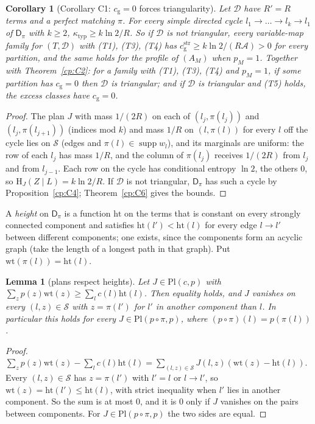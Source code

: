 \documentclass[11pt]{article}
\newtheorem{lemma}[theorem]{Lemma}
\newtheorem{corollary}[theorem]{Corollary}
\theoremstyle{definition}
\theoremstyle{remark}
\newcommand{\Ent}{\mathrm{H}}                 %
\DeclareMathOperator{\supp}{supp}
\newcommand{\cg}{c_{\mathrm g}}               %
\newcommand{\Tcond}[1]{\textup{(T#1)}}        %
\newcommand{\Acs}{\mathcal A}                %
\newcommand{\ktyp}{\kappa_{\mathrm{typ}}}    %
\newcommand{\Dpi}{\mathsf D_\pi}             %
\newcommand{\Sr}{\mathcal S}                 %
\newcommand{\Pl}{\mathrm{Pl}}                %
\newcommand{\wt}{\mathrm{wt}}                %
\newcommand{\hgt}{\mathrm{ht}}               %
\begin{document}
\begin{corollary}[Corollary C1: $\cg=0$ forces triangularity]\label{cp:C7}
Let $\mathcal D$ have $R'=R$ terms and a perfect matching $\pi$. For every simple directed cycle $l_1\to\dots\to l_k\to l_1$ of $\Dpi$ with $k\ge2$, $\ktyp\ge k\ln2/R$. So if $\mathcal D$ is not triangular, every variable-map family for $(T,\mathcal D)$ with \Tcond1, \Tcond3, \Tcond4{} has $\cg^{\mathrm{str}}\ge k\ln2/(R\Acs)>0$ for every partition, and the same holds for the profile of $(A_M)$ when $p_M=1$. Together with Theorem~\ref{cp:C2}: for a family with \Tcond1, \Tcond3, \Tcond4{} and $p_M=1$, if some partition has $\cg=0$ then $\mathcal D$ is triangular; and if $\mathcal D$ is triangular and \Tcond5{} holds, the excess classes have $\cg=0$.
\end{corollary}

\begin{proof}
The plan $J$ with mass $1/(2R)$ on each of $(l_j,\pi(l_j))$ and $(l_j,\pi(l_{j+1}))$ (indices mod $k$) and mass $1/R$ on $(l,\pi(l))$ for every $l$ off the cycle lies on $\Sr$ (edges and $\pi(l)\in\supp w_l$), and its marginals are uniform: the row of each $l_j$ has mass $1/R$, and the column of $\pi(l_j)$ receives $1/(2R)$ from $l_j$ and from $l_{j-1}$. Each row on the cycle has conditional entropy $\ln2$, the others $0$, so $\Ent_J(Z\mid L)=k\ln2/R$. If $\mathcal D$ is not triangular, $\Dpi$ has such a cycle by Proposition~\ref{cp:C4}; Theorem~\ref{cp:C6} gives the bounds.
\end{proof}

A \emph{height} on $\Dpi$ is a function $\hgt$ on the terms that is constant on every strongly connected component and satisfies $\hgt(l')<\hgt(l)$ for every edge $l\to l'$ between different components; one exists, since the components form an acyclic graph (take the length of a longest path in that graph). Put $\wt(\pi(l))=\hgt(l)$.

\begin{lemma}[plans respect heights]\label{cp:C8:H}
Let $J\in\Pl(c,p)$ with $\sum_zp(z)\wt(z)\ge\sum_lc(l)\hgt(l)$. Then equality holds, and $J$ vanishes on every $(l,z)\in\Sr$ with $z=\pi(l')$ for $l'$ in another component than $l$. In particular this holds for every $J\in\Pl(p\circ\pi,p)$, where $(p\circ\pi)(l)=p(\pi(l))$.
\end{lemma}

\begin{proof}
$\sum_zp(z)\wt(z)-\sum_lc(l)\hgt(l)=\sum_{(l,z)\in\Sr}J(l,z)(\wt(z)-\hgt(l))$. Every $(l,z)\in\Sr$ has $z=\pi(l')$ with $l'=l$ or $l\to l'$, so $\wt(z)=\hgt(l')\le\hgt(l)$, with strict inequality when $l'$ lies in another component. So the sum is at most $0$, and it is $0$ only if $J$ vanishes on the pairs between components. For $J\in\Pl(p\circ\pi,p)$ the two sides are equal.
\end{proof}
\end{document}
